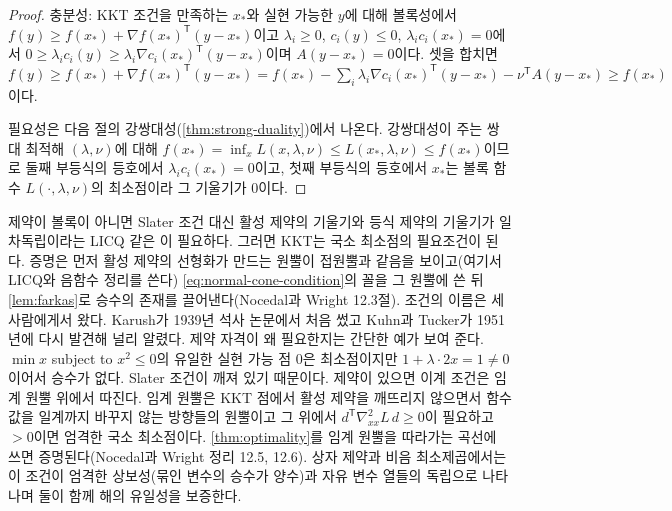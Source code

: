 \begin{proof}
충분성: KKT 조건을 만족하는 $x_\ast$와 실현 가능한 $y$에 대해 볼록성에서 $f(y)\ge f(x_\ast)+\nabla f(x_\ast)^{\mathsf T}(y-x_\ast)$이고 $\lambda_i\ge0$, $c_i(y)\le0$, $\lambda_ic_i(x_\ast)=0$에서 $0\ge\lambda_ic_i(y)\ge\lambda_i\nabla c_i(x_\ast)^{\mathsf T}(y-x_\ast)$이며 $A(y-x_\ast)=0$이다. 셋을 합치면 $f(y)\ge f(x_\ast)+\nabla f(x_\ast)^{\mathsf T}(y-x_\ast)=f(x_\ast)-\sum_i\lambda_i\nabla c_i(x_\ast)^{\mathsf T}(y-x_\ast)-\nu^{\mathsf T}A(y-x_\ast)\ge f(x_\ast)$이다.

필요성은 다음 절의 강쌍대성(\cref{thm:strong-duality})에서 나온다. 강쌍대성이 주는 쌍대 최적해 $(\lambda,\nu)$에 대해 $f(x_\ast)=\inf_xL(x,\lambda,\nu)\le L(x_\ast,\lambda,\nu)\le f(x_\ast)$이므로 둘째 부등식의 등호에서 $\lambda_ic_i(x_\ast)=0$이고, 첫째 부등식의 등호에서 $x_\ast$는 볼록 함수 $L(\cdot,\lambda,\nu)$의 최소점이라 그 기울기가 $0$이다.
\end{proof}

제약이 볼록이 아니면 Slater 조건 대신 활성 제약의 기울기와 등식 제약의 기울기가 일차독립이라는 LICQ 같은 이 필요하다. 그러면 KKT는 국소 최소점의 필요조건이 된다. 증명은 먼저 활성 제약의 선형화가 만드는 원뿔이 접원뿔과 같음을 보이고(여기서 LICQ와 음함수 정리를 쓴다) \cref{eq:normal-cone-condition}의 꼴을 그 원뿔에 쓴 뒤 \cref{lem:farkas}로 승수의 존재를 끌어낸다(Nocedal과 Wright\cite{nocedal2006} 12.3절). 조건의 이름은 세 사람에게서 왔다. Karush\cite{karush1939}가 1939년 석사 논문에서 처음 썼고 Kuhn과 Tucker\cite{kuhn1951}가 1951년에 다시 발견해 널리 알렸다. 제약 자격이 왜 필요한지는 간단한 예가 보여 준다. $\min x$ subject to $x^2\le0$의 유일한 실현 가능 점 $0$은 최소점이지만 $1+\lambda\cdot2x=1\ne0$이어서 승수가 없다. Slater 조건이 깨져 있기 때문이다. 제약이 있으면 이계 조건은 임계 원뿔 위에서 따진다. 임계 원뿔은 KKT 점에서 활성 제약을 깨뜨리지 않으면서 함수값을 일계까지 바꾸지 않는 방향들의 원뿔이고 그 위에서 $d^{\mathsf T}\nabla^2_{xx}L\,d\ge0$이 필요하고 $>0$이면 엄격한 국소 최소점이다. \cref{thm:optimality}를 임계 원뿔을 따라가는 곡선에 쓰면 증명된다(Nocedal과 Wright\cite{nocedal2006} 정리 12.5, 12.6). 상자 제약과 비음 최소제곱에서는 이 조건이 엄격한 상보성(묶인 변수의 승수가 양수)과 자유 변수 열들의 독립으로 나타나며 둘이 함께 해의 유일성을 보증한다.

